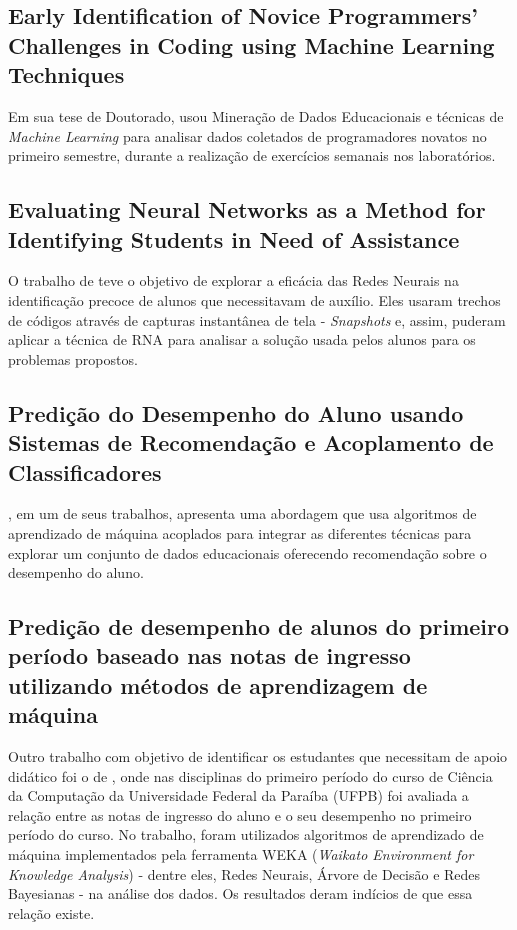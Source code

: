 \documentclass[
	12pt,				%
	openright,			%
	oneside,
	a4paper,			%
	english,			%
	french,				%
	spanish,			%
	brazil,				%
	]{abntex2}
\begin{document}
\subsection{Early Identification of Novice Programmers' Challenges in Coding using Machine Learning Techniques}
\label{sec:Early}
Em sua tese de Doutorado,  usou Mineração de Dados Educacionais e técnicas de \textit{Machine Learning} para analisar dados coletados de programadores novatos no primeiro semestre, durante a realização de exercícios semanais nos laboratórios.

\subsection{Evaluating Neural Networks as a Method for Identifying Students in Need of Assistance}
\label{sec:Evaluating}
O trabalho de  teve o objetivo de explorar a eficácia das Redes Neurais na identificação precoce de alunos que necessitavam de auxílio. Eles usaram trechos de códigos através de capturas instantânea de tela - \textit{Snapshots} e, assim, puderam aplicar a técnica de RNA para analisar a solução usada pelos alunos para os problemas propostos.

\subsection{Predição do Desempenho do Aluno usando Sistemas de Recomendação e Acoplamento de Classificadores}
\label{sec:Pred1}
, em um de seus trabalhos, apresenta uma abordagem que usa algoritmos de aprendizado de máquina acoplados para integrar as diferentes técnicas para explorar um conjunto de dados educacionais oferecendo recomendação sobre o desempenho do aluno.

\subsection{Predição de desempenho de alunos do primeiro período baseado nas notas de ingresso utilizando métodos de aprendizagem de máquina}
\label{sec:Pred2}
Outro trabalho com objetivo de identificar os estudantes que necessitam de apoio didático foi o de , onde nas disciplinas do primeiro período do curso de Ciência da Computação da Universidade Federal da Paraíba (UFPB) foi avaliada a relação entre as notas de ingresso do aluno e o seu desempenho no primeiro período do curso. No trabalho, foram utilizados algoritmos de aprendizado de máquina implementados pela ferramenta WEKA (\textit{Waikato Environment for Knowledge Analysis}) - dentre eles, Redes Neurais, Árvore de Decisão e Redes Bayesianas - na análise dos dados. Os resultados deram indícios de que essa relação existe.
\end{document}
